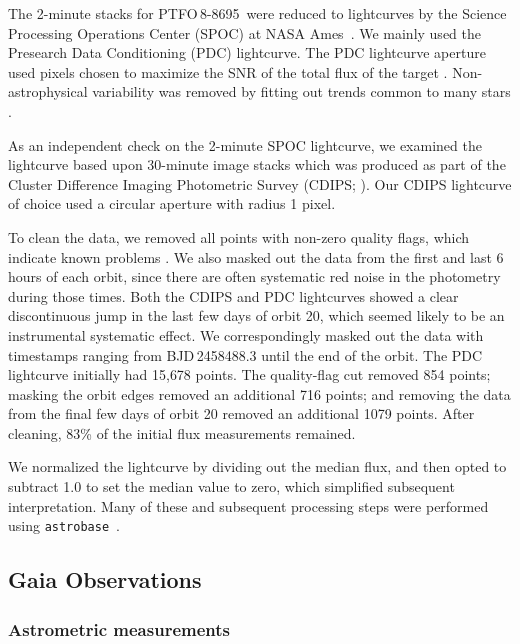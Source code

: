 \documentclass[12pt,twocolumn,tighten]{aastex62}
\newcommand{\ptfo}{PTFO$\,$8-8695}
\begin{document}
The 2-minute stacks for \ptfo\ were reduced to lightcurves by the
Science Processing Operations Center (SPOC) at NASA
Ames~\citep{jenkins_tess_2016}.  We mainly used the Presearch Data
Conditioning (PDC) lightcurve.  The PDC lightcurve aperture used
pixels chosen to maximize the SNR of the total flux of the target
\citep{smith_finding_2016}.  Non-astrophysical variability
was removed by fitting out trends common to many stars
\citep{smith_kepler_2012,stumpe_multiscale_2014}.

As an independent check on the 2-minute SPOC lightcurve, we examined
the lightcurve based upon 30-minute image stacks which was produced as
part of the Cluster Difference Imaging Photometric Survey (CDIPS;
\citealt{bouma_cluster_2019}).  Our CDIPS lightcurve of choice used a
circular aperture with radius 1 pixel.

To clean the data, we removed all points with non-zero quality flags,
which indicate known problems \citep[{\it
e.g.},][]{tess_data_product_description_2018}.  We also masked out the
data from the first and last 6 hours of each orbit, since there are
often systematic red noise in the photometry during those times.  Both
the CDIPS and PDC lightcurves showed a clear discontinuous jump in the
last few days of orbit 20, which seemed likely to be an instrumental
systematic effect.  We correspondingly masked out the data with
timestamps ranging from BJD\,2458488.3 until the end of the orbit.
The PDC lightcurve initially had 15{,}678 points.  The quality-flag
cut removed 854 points; masking the orbit edges removed an additional
716 points; and removing the data from the final few days of orbit 20
removed an additional 1079 points.  After cleaning, 83\% of the
initial flux measurements remained.

We normalized the lightcurve by dividing out the median flux, and then
opted to subtract 1{.}0 to set the median value to zero, which
simplified subsequent interpretation.  Many of these and subsequent
processing steps were performed using
\texttt{astrobase}~\citep{bhatti_astrobase_2018}. 


\subsection{Gaia Observations}

\subsubsection{Astrometric measurements}
\end{document}
